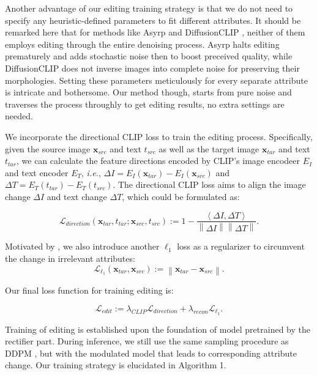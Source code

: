 \documentclass[letterpaper]{article} %
\begin{document}
Another advantage of our editing training strategy is that we do not need to specify any heuristic-defined parameters to fit different attributes. It should be remarked here that for methods like Asyrp \cite{kwon2022diffusion} and DiffusionCLIP \cite{kim2022diffusionclip}, neither of them employs editing through the entire denoising process. Asyrp halts editing prematurely and adds stochastic noise then to boost preceived quality, while DiffusionCLIP does not inverse images into complete noise for preserving their morphologies. Setting these parameters meticulously for every separate attribute is intricate and bothersome. Our method though, starts from pure noise and traverses the process throughly to get editing results, no extra settings are needed.

We incorporate the directional CLIP loss \cite{gal2022stylegan} to train the editing process. Specifically, given the source image $\bm{x}_{src}$ and text $t_{src}$ as well as the target image $\bm{x}_{tar}$ and text $t_{tar}$, we can calculate the feature directions encoded by CLIP's image encodeer $E_I$ and text encoder $E_T$, \textit{i.e.}, $\Delta I = E_I(\bm{x}_{tar}) - E_I(\bm{x}_{src})$ and $\Delta T=E_T(t_{tar})-E_T(t_{src})$. The directional CLIP loss aims to align the image change $\Delta I$ and text change $\Delta T$, which could be formulated as:

\begin{equation}
    \mathcal{L}_{direction}(\bm{x}_{tar}, t_{tar};\bm{x}_{src},t_{src}) := 1 - \frac{\left \langle \Delta I,\Delta T \right \rangle }{\left \| \Delta I \right \| \left \| \Delta T \right \| }.
\end{equation}

Motivated by \cite{kim2022diffusionclip}, we also introduce another $\ell_1$ loss as a regularizer to circumvent the change in irrelevant attributes:
\begin{equation}
    \mathcal{L}_{\ell_1}(\bm{x}_{tar}, \bm{x}_{src}) := \left \| \bm{x}_{tar} - \bm{x}_{src} \right \|.
\end{equation}

Our final loss function for training editing is:

\begin{equation}
    \mathcal{L}_{edit} := \lambda_{CLIP}\mathcal{L}_{direction} + \lambda_{recon} \mathcal{L}_{\ell_1}.
\end{equation}

Training of editing is established upon the foundation of model pretrained by the rectifier part. During inference, we still use the same sampling procedure as DDPM \cite{ho2020denoising}, but with the modulated model that leads to corresponding attribute change. Our training strategy is elucidated in Algorithm 1.
\end{document}
